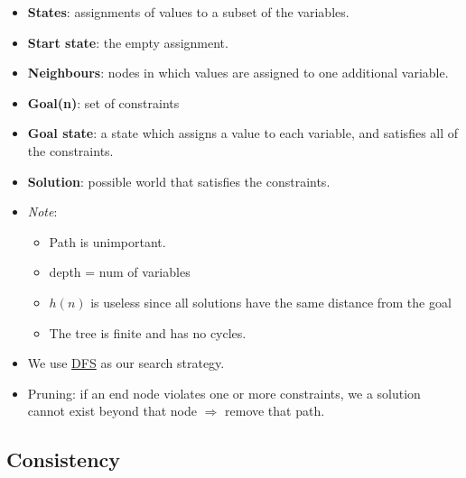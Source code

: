 \documentclass{article}
\begin{document}
\begin{itemize}
    \item \textbf{States}: assignments of values to a subset of the variables.
    \item \textbf{Start state}: the empty assignment.
    \item \textbf{Neighbours}: nodes in which values are assigned to one additional variable.
    \item \textbf{Goal(n)}: set of constraints
    \item \textbf{Goal state}: a state which assigns a value to each variable, and satisfies all of the constraints.
    \item \textbf{Solution}: possible world that satisfies the constraints.
    \item \textit{Note}: 
        \begin{itemize}
            \item Path is unimportant.
            \item depth = num of variables
            \item $h(n)$ is useless since all solutions have the same distance from the goal
            \item The tree is finite and has no cycles.
        \end{itemize}
    \item We use \underline{DFS} as our search strategy.
    \item Pruning: if an end node violates one or more constraints, we a solution cannot exist beyond that node $\Rightarrow$ remove that path.
\end{itemize}

\subsection{Consistency}
\end{document}
